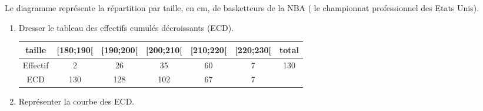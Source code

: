 Le diagramme représente la répartition par taille, en cm, de basketteurs de la NBA ( le championnat professionnel des Etats Unis).
\begin{enumerate}
\item Dresser le tableau des effectifs cumulés décroissants (ECD).


\begin{tabular}{|c|c|c|c|c|c|c|}
\hline 
taille & [180;190[ & [190;200[ & [200;210[ & [210;220[ & [220;230[ & total \\ 
\hline 
Effectif & 2 & 26 & 35 & 60 & 7 & 130 \\ 
\hline 
ECD & 130 & 128 & 102 & 67 & 7 &  \\ 
\hline 
\end{tabular} 


\item  Représenter la courbe des ECD.


\end{enumerate}
